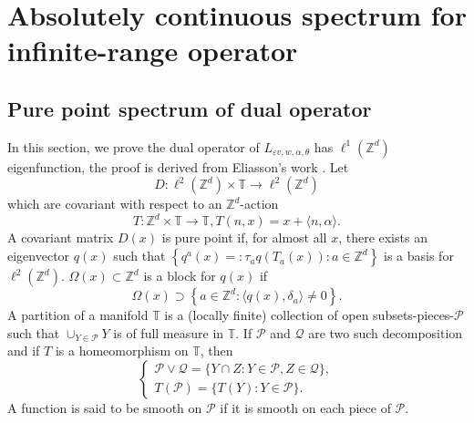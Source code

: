 \documentclass[11pt]{amsart}
\theoremstyle{remark}
\theoremstyle{definition}
\newcommand{\T}{{\mathbf T}}
\newcommand{\Z}{{\mathbf Z}}
\def \Z{\mathcal{Z}}
\def\Z{{\mathbb Z}}
\def\T{{\mathbb T}}
\begin{document}
\section{Absolutely continuous spectrum for infinite-range operator}\label{proof-infinite}


\subsection{Pure point spectrum of dual operator}
In this section, we prove the dual operator of ${L}_{\varepsilon v,w,\alpha,\theta}$ has $\ell^1(\Z^d)$ eigenfunction, the proof is derived from Eliasson's work \cite{E}. 
Let 
$$
D: \ell^2(\Z^d ) \times \T \rightarrow \ell^2(\Z^d )
$$
which are covariant with respect to an $\Z^d $-action
$$
T: \Z^d  \times \T \rightarrow \T, T(n,x)=x+\langle n,\alpha\rangle.
$$
A covariant matrix $D(x)$ is pure point if, for almost all $x$, there exists an eigenvector $q(x)$ such that $\left\{q^a(x)=: \tau_a q\left(T_a(x)\right): a \in \Z^d \right\}$ is a basis for $\ell^2(\Z^d )$. $\Omega(x) \subset \Z^d $ is a block for $q(x)$ if
$$
\Omega(x) \supset\left\{a \in \Z^d :\langle q(x),\delta_a\rangle\neq0\right\} .
$$
A partition of a manifold $\T$ is a (locally finite) collection of open subsets-pieces-$\mathcal{P}$ such that $\cup_{Y \in \mathcal{P}} Y$ is of full measure in $\T$. If $\mathcal{P}$ and $\mathcal{Q}$ are two such decomposition and if $T$ is a homeomorphism on $\T$, then
$$
\left\{\begin{array}{l}
\mathcal{P} \vee \mathcal{Q}=\{Y \cap Z: Y \in \mathcal{P}, Z \in \mathcal{Q}\}, \\
T(\mathcal{P})=\{T(Y): Y \in \mathcal{P}\}.
\end{array}\right.
$$
A function is said to be smooth on $\mathcal{P}$ if it is smooth on each piece of $\mathcal{P}$.
\end{document}

